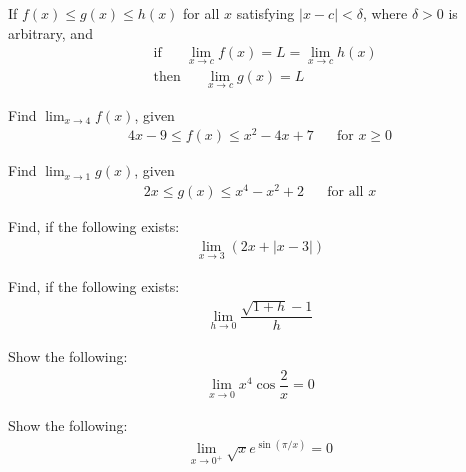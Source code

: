 \begin{theorem}
If $f(x) \leq g(x) \leq h(x)$ for all $x$ satisfying $\lvert x - c \rvert < \delta$, where $\delta > 0$ is arbitrary, and
\begin{align*}
    &\text{if} \hspace{20pt} \lim_{x \longrightarrow c} f(x) = L = \lim_{x \longrightarrow c} h(x)\\[2ex]
    &\text{then} \hspace{20pt} \lim_{x \longrightarrow c} g(x) = L
\end{align*}
\end{theorem}

\begin{exercise}
Find $\lim_{x \longrightarrow 4} f(x)$, given
\begin{align*}
    4x-9 \leq f(x) \leq x^{2} - 4x + 7 \hspace{20pt} \text{for} \hspace{4pt} x \geq 0
\end{align*}
\end{exercise}

\begin{exercise}
Find $\lim_{x \longrightarrow 1} g(x)$, given 
\begin{align*}
    2x \leq g(x) \leq x^{4} - x^{2} + 2 \hspace{20pt} \text{for all} \hspace{4pt} x
\end{align*}
\end{exercise}

\begin{exercise}
Find, if the following exists:
\begin{align*}
    \lim_{x \longrightarrow 3} (2x + \lvert x-3 \rvert)
\end{align*}
\end{exercise}

\begin{exercise}
Find, if the following exists:
\begin{align*}
    \lim_{h \longrightarrow 0} \dfrac{\sqrt{1+h} - 1}{h}
\end{align*}
\end{exercise}

\begin{exercise}
Show the following:
\begin{align*}
    \lim_{x \longrightarrow 0} x^{4} \cos \dfrac{2}{x} = 0
\end{align*}
\end{exercise}

\begin{exercise}
Show the following:
\begin{align*}
    \lim_{x \longrightarrow 0^{+}} \sqrt{x} e^{\sin (\pi/x)} = 0
\end{align*}
\end{exercise}